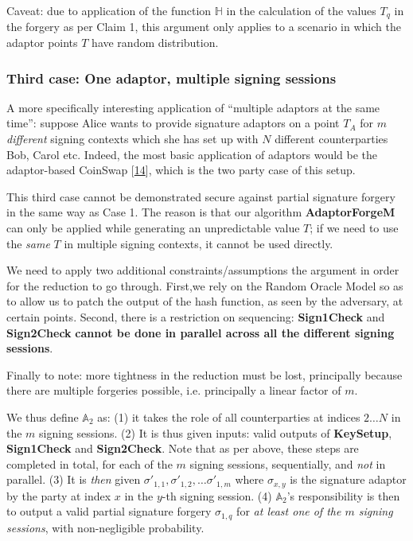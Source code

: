 \documentclass[10pt,a4paper]{article}
\begin{document}
\vspace{5 pt}

Caveat: due to application of the function $\mathbb{H}$ in the calculation of the values $T_q$ in the forgery as per Claim 1, this argument only applies to a scenario in which the adaptor points $T$ have random distribution.

\subsubsection{Third case: One adaptor, multiple signing sessions}

A more specifically interesting application of ``multiple adaptors at the same time'': suppose Alice wants to provide signature adaptors on a point $T_A$ for $m$ \emph{different} signing contexts which she has set up with $N$ different counterparties Bob, Carol etc. Indeed, the most basic application of adaptors would be the adaptor-based CoinSwap {[}\protect\hyperlink{anchor-14}{14}{]}, which is the two party case of this setup.

\vspace{5 pt}

This third case cannot be demonstrated secure against partial signature forgery in the same way as Case 1. The reason is that our algorithm \textbf{AdaptorForgeM} can only be applied while generating an unpredictable value $T$; if we need to use the \emph{same} $T$ in multiple signing contexts, it cannot be used directly.

We need to apply two additional constraints/assumptions the argument in order for the reduction to go through. First,we rely on the Random Oracle Model so as to allow us to patch the output of the hash function, as seen by the adversary, at certain points. Second, there is a restriction on sequencing: \textbf{Sign1Check} and \textbf{Sign2Check} \textbf{cannot be done in parallel across all the different signing sessions}.

Finally to note: more tightness in the reduction must be lost, principally because there are multiple forgeries possible, i.e. principally a linear factor of $m$.


\vspace{5 pt} We thus define $\mathbb{A}_2$ as: (1) it takes the role of all counterparties at indices $2 \ldots N$ in the $m$ signing sessions. (2) It is thus given inputs: valid outputs of \textbf{KeySetup}, \textbf{Sign1Check} and \textbf{Sign2Check}. Note that as per above, these steps are completed in total, for each of the $m$ signing sessions, sequentially, and \emph{not} in parallel. (3) It is \emph{then} given $\sigma'_{1,1}, \sigma'_{1,2}, \ldots \sigma'_{1,m}$ where $\sigma_{x,y}$ is the signature adaptor by the party at index $x$ in the $y$-th signing session. (4) $\mathbb{A}_2$'s responsibility is then to output a valid partial signature forgery $\sigma_{1,q}$ for \emph{at least one of the $m$ signing sessions}, with non-negligible probability.
\end{document}
